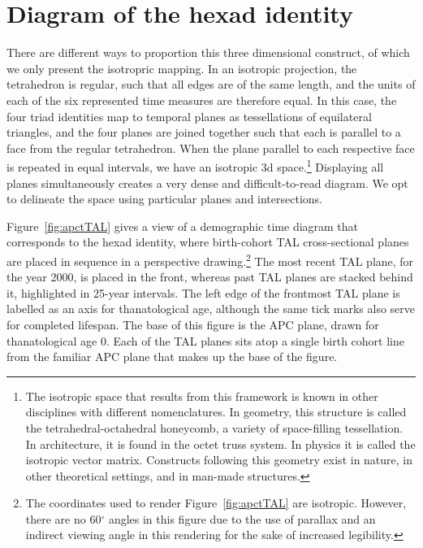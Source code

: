 \documentclass[12pt,oneside,a4paper]{article} %
\begin{document}
 \section{Diagram of the hexad identity}
 There are different ways to proportion this three dimensional construct,
of which we only present the isotropric mapping. In an isotropic projection, the
tetrahedron is regular, such that all edges are of the same length, and the
units of each of the six represented time measures are therefore equal. In this
case, the four triad identities map to temporal planes as tessellations of equilateral
triangles, and the four planes are joined together such that each is parallel to
a face from the regular tetrahedron. When the plane parallel to each
respective face is repeated in equal intervals, we have an isotropic 3d space.\footnote{The isotropic space that results from this
framework is known in other disciplines with different
nomenclatures. In geometry, this structure is called the
tetrahedral-octahedral honeycomb, a variety of space-filling tessellation. In
architecture, it is found in the octet truss system. In physics it is called
the isotropic vector matrix. Constructs following this geometry exist in nature,
in other theoretical settings, and in man-made structures.}
Displaying all planes simultaneously creates a very dense and difficult-to-read
diagram. We opt to delineate the space using particular planes and
intersections.

Figure~\ref{fig:apctTAL} gives a view of a demographic
time diagram that corresponds to the hexad identity, where birth-cohort TAL
cross-sectional planes are placed in sequence in a perspective drawing.\footnote{The coordinates used to render Figure~\ref{fig:apctTAL} are isotropic.
However, there are no 60$^\circ$ angles in this figure due to the use of
parallax and an indirect viewing angle in this rendering for the sake of
increased legibility.} The most recent TAL plane, for the year 2000, is placed
in the front, whereas past TAL planes are stacked behind it, highlighted in
25-year intervals. The left edge of the frontmost TAL plane is labelled as an
axis for thanatological age, although the same tick marks also serve for
completed lifespan.
The base of this figure is the APC plane, drawn for thanatological age 0.
Each of the TAL planes sits atop a single birth cohort line from the familiar APC plane that makes up the base of the figure.
\end{document}
